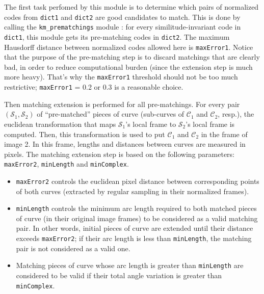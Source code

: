 The first task perfomed by this module is to determine which pairs of
normalized codes from \verb+dict1+ and \verb+dict2+ are good
candidates to match. This is done by calling the
\verb?km_prematchings? module : for every similitude-invariant 
code in \verb+dict1+, this module gets its pre-matching codes in
\verb+dict2+. The maximum Hausdorff distance between normalized codes
allowed here is \verb+maxError1+. Notice that the purpose of the
pre-matching step is to discard matchings that are clearly bad, in
order to reduce computational burden (since the extension step is much
more heavy). That's why the \verb+maxError1+ threshold should not be
too much restrictive; \verb+maxError1+ = 0.2 or 0.3 is a reasonable
choice.

Then matching extension is performed for all pre-matchings. For every
pair $({\mathcal S}_1,{\mathcal S}_2)$ of ``pre-matched'' pieces of
curve (sub-curves of ${\mathcal C}_1$ and ${\mathcal C}_2$, resp.),
the euclidean transformation that maps ${\mathcal S}_1$'s local frame
to ${\mathcal S}_2$'s local frame is computed. Then, this
transformation is used to put ${\mathcal C}_1$ and ${\mathcal C}_2$ in
the frame of image 2. In this frame, lengths and distances between
curves are measured in pixels. The matching extension step is based on
the following parameters: \verb+maxError2+, \verb+minLength+ and
\verb+minComplex+.

\begin{itemize}
  
\item \verb+maxError2+ controls the euclidean pixel distance between
  corresponding points of both curves (extracted by regular sampling
  in their normalized frames). 
  
\item \verb+minLength+ controls the minimum arc length required to
  both matched pieces of curve (in their original image frames) to be
  considered as a valid matching pair. In other words, initial pieces of
  curve are extended until their distance exceeds \verb+maxError2+; if
  their arc length is less than \verb+minLength+, the matching pair is not
  considered as a valid one.
  
\item Matching pieces of curve whose arc length is greater than
  \verb+minLength+ are considered to be valid if their total angle
  variation is greater than \verb+minComplex+.

\end{itemize}

